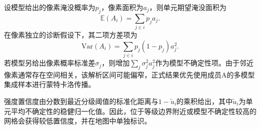 设模型给出的像素淹没概率为$p_j$，像素面积为$a_j$，则单元期望淹没面积为
\begin{equation}
 \mathbb E(A_i)=\sum_{j\in i}p_ja_j.
\end{equation}
在像素独立的诊断假设下，其二项方差项为
\begin{equation}
 \mathrm{Var}(A_i)=\sum_{j\in i}p_j(1-p_j)a_j^2.
\end{equation}
若模型另给出像素概率标准差$\sigma_j$，则增加$\sum_j\sigma_j^2a_j^2$作为模型不确定性项。由于邻近像素通常存在空间相关，该解析区间可能偏窄，正式结果优先使用成员A的多模型集成样本进行蒙特卡洛传播。

强度置信度由分数到最近分级阈值的标准化距离与$1-\widetilde u_i$的乘积给出，其中$\widetilde u_i$为单元平均不确定性的稳健归一化值。因此，位于等级边界附近或模型不确定性较高的网格会获得较低置信度，并在地图中单独标识。
